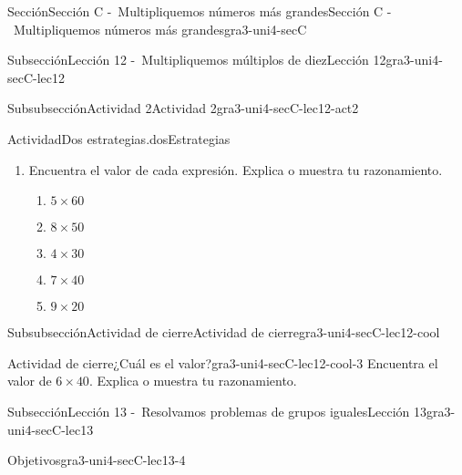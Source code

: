 \documentclass[twoside,10pt,]{article}
\begin{document}
\begin{sectionptx}{Sección}{Sección C -~Multipliquemos números más grandes}{}{Sección C -~Multipliquemos números más grandes}{}{}{gra3-uni4-secC}
\begin{subsectionptx}{Subsección}{Lección 12 -~Multipliquemos múltiplos de diez}{}{Lección 12}{}{}{gra3-uni4-secC-lec12}
\begin{subsubsectionptx}{Subsubsección}{Actividad 2}{}{Actividad 2}{}{}{gra3-uni4-secC-lec12-act2}
\begin{activity}{Actividad}{Dos estrategias.}{dosEstrategias}
\begin{enumerate}
\begin{image}{0}{1}{0}{}%
\texttt{[image: external/svg-source/tikz-file-149356.pdf]}
\end{image}%
%
\begin{itemize}[label=\textbullet]
\item{}Jada contó: 30, 60, 90, 120, 150, 180, 210, 240 y dijo que la respuesta es 240.%
\item{}Kiran dijo que él sabía que \(8\times 3\) es 24, luego encontró \(24\times 10\) y obtuvo 240.%
\end{itemize}
¿En qué se parecen las estrategias de Jada y de Kiran? ¿En qué son diferentes?%
\item{}Encuentra el valor de cada expresión. Explica o muestra tu razonamiento.%
%
\begin{enumerate}
\item{}\(\displaystyle 5 \times 60\)%
\item{}\(\displaystyle 8 \times 50\)%
\item{}\(\displaystyle 4 \times 30\)%
\item{}\(\displaystyle 7 \times 40\)%
\item{}\(\displaystyle 9 \times 20\)%
\end{enumerate}
\end{enumerate}
\end{activity}%
\end{subsubsectionptx}
%
%
\typeout{************************************************}
\typeout{************************************************}
%
\begin{subsubsectionptx}{Subsubsección}{Actividad de cierre}{}{Actividad de cierre}{}{}{gra3-uni4-secC-lec12-cool}
\begin{project}{Actividad de cierre}{¿Cuál es el valor?}{gra3-uni4-secC-lec12-cool-3}%
Encuentra el valor de \(6\times 40\). Explica o muestra tu razonamiento.%
\end{project}%
\end{subsubsectionptx}
\end{subsectionptx}
%
%
\typeout{************************************************}
\typeout{************************************************}
%
\begin{subsectionptx}{Subsección}{Lección 13 -~Resolvamos problemas de grupos iguales}{}{Lección 13}{}{}{gra3-uni4-secC-lec13}
\begin{objectives}{Objetivos}{gra3-uni4-secC-lec13-4}

\end{objectives}
\end{subsectionptx}
\end{sectionptx}
\end{document}
